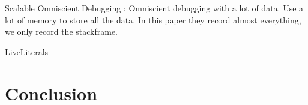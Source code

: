 \documentclass[english,submission]{programming}
\begin{document}
Scalable Omniscient Debugging\cite{ScalableOmniscient} : Omniscient debugging with a lot of data. Use a lot of memory to store all the data.
In this paper they record almost everything, we only record the stackframe.

LiveLiterals~\cite{LiveLiterals}

\section{Conclusion}
\label{sec:conclusion}

\printbibliography
\end{document}
